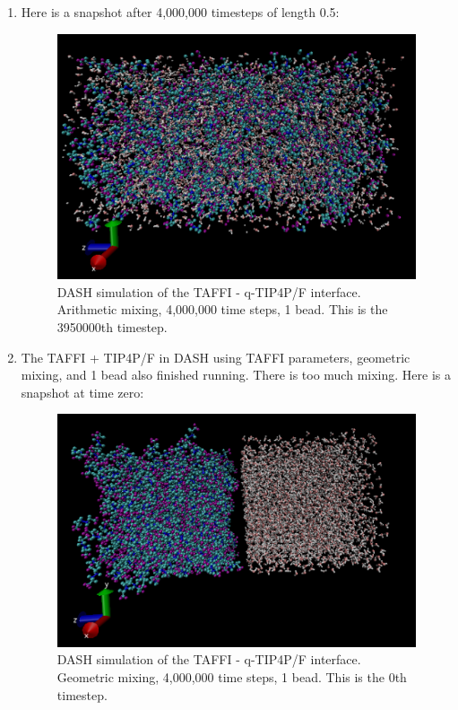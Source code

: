 \documentclass[12pt,reqno]{amsart}
\numberwithin{equation}{section}
\begin{document}
\begin{enumerate}
\item Here is a snapshot after 4,000,000 timesteps of length 0.5:
\begin{figure}[H]
\centering
\includegraphics[scale=0.7]{dash_taffi-tip4pF_arithmetic_1bead_3950000}
\caption{DASH simulation of the TAFFI - q-TIP4P/F interface.  Arithmetic mixing, 4,000,000 time steps, 1 bead.  This is the 3950000th timestep.}
\end{figure}

\item The TAFFI + TIP4P/F in DASH using TAFFI parameters, geometric mixing, and 1 bead also finished running.  There is too much mixing.  Here is a snapshot at time zero:

\begin{figure}[H]
\centering
\includegraphics[scale=0.7]{dash_taffi-tip4pF_geometric_1bead_0}
\caption{DASH simulation of the TAFFI - q-TIP4P/F interface.  Geometric mixing, 4,000,000 time steps, 1 bead.  This is the 0th timestep.}
\end{figure}


\end{enumerate}
\end{document}
